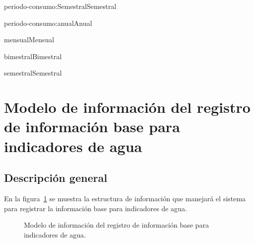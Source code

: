 \begin{BusinessFact}{periodo-consumo:Semestral}{Semestral}
\end{BusinessFact}

\begin{BusinessFact}{periodo-consumo:anual}{Anual}
\end{BusinessFact}
\begin{BusinessEntity}{mensual}{Mensual}
\end{BusinessEntity}

\begin{BusinessEntity}{bimestral}{Bimestral}
\end{BusinessEntity}

\begin{BusinessEntity}{semestral}{Semestral}
\end{BusinessEntity}

\section{Modelo de información del registro de información base para indicadores de agua}

\subsection{Descripción general}
 En la figura~\ref{fig:registroInfoBaseAgua} se muestra la estructura de información que manejará el sistema para registrar la información base para indicadores de agua.
 
\begin{figure}[htbp!]
	\begin{center}
		\caption{Modelo de información del registro de información base para indicadores de agua.}
		\label{fig:registroInfoBaseAgua}
	\end{center}
\end{figure}

